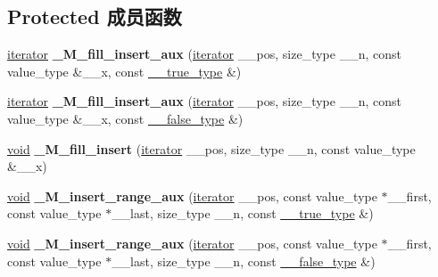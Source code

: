 \subsection*{Protected 成员函数}
\begin{DoxyCompactItemize}
\item 
\mbox{\label{classdeque_a427d7619e13343730ab6332670c8dd83}} 
\hyperlink{structiterator}{iterator} {\bfseries \+\_\+\+M\+\_\+fill\+\_\+insert\+\_\+aux} (\hyperlink{structiterator}{iterator} \+\_\+\+\_\+pos, size\+\_\+type \+\_\+\+\_\+n, const value\+\_\+type \&\+\_\+\+\_\+x, const \hyperlink{struct____true__type}{\+\_\+\+\_\+true\+\_\+type} \&)
\item 
\mbox{\label{classdeque_a2d8abfced406fdc56fcc4d9df9d942c7}} 
\hyperlink{structiterator}{iterator} {\bfseries \+\_\+\+M\+\_\+fill\+\_\+insert\+\_\+aux} (\hyperlink{structiterator}{iterator} \+\_\+\+\_\+pos, size\+\_\+type \+\_\+\+\_\+n, const value\+\_\+type \&\+\_\+\+\_\+x, const \hyperlink{struct____false__type}{\+\_\+\+\_\+false\+\_\+type} \&)
\item 
\mbox{\label{classdeque_adfccaff30b2f6902781d8616bf448677}} 
\hyperlink{interfacevoid}{void} {\bfseries \+\_\+\+M\+\_\+fill\+\_\+insert} (\hyperlink{structiterator}{iterator} \+\_\+\+\_\+pos, size\+\_\+type \+\_\+\+\_\+n, const value\+\_\+type \&\+\_\+\+\_\+x)
\item 
\mbox{\label{classdeque_aef333ffc3e9332c4f100aa1dbb2f0dd5}} 
\hyperlink{interfacevoid}{void} {\bfseries \+\_\+\+M\+\_\+insert\+\_\+range\+\_\+aux} (\hyperlink{structiterator}{iterator} \+\_\+\+\_\+pos, const value\+\_\+type $\ast$\+\_\+\+\_\+first, const value\+\_\+type $\ast$\+\_\+\+\_\+last, size\+\_\+type \+\_\+\+\_\+n, const \hyperlink{struct____true__type}{\+\_\+\+\_\+true\+\_\+type} \&)
\item 
\mbox{\label{classdeque_af6f99625725bafb7d20d8555bb06edb2}} 
\hyperlink{interfacevoid}{void} {\bfseries \+\_\+\+M\+\_\+insert\+\_\+range\+\_\+aux} (\hyperlink{structiterator}{iterator} \+\_\+\+\_\+pos, const value\+\_\+type $\ast$\+\_\+\+\_\+first, const value\+\_\+type $\ast$\+\_\+\+\_\+last, size\+\_\+type \+\_\+\+\_\+n, const \hyperlink{struct____false__type}{\+\_\+\+\_\+false\+\_\+type} \&)
\item 
\mbox{\label{classdeque_a1824b9198f5ec8f6da7d8b67b1d9a19e}} 

\end{DoxyCompactItemize}

